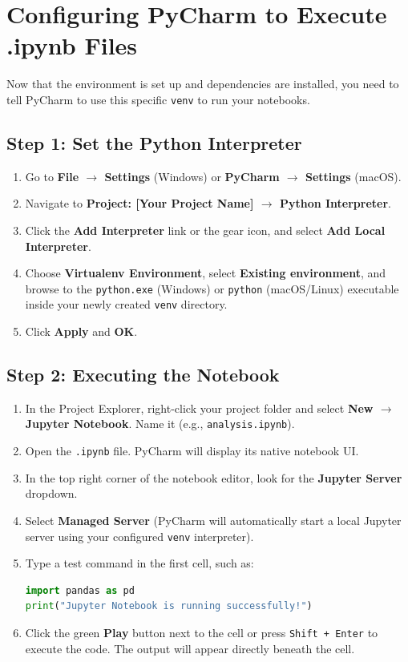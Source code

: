 \documentclass[12pt, a4paper]{article}
\begin{document}
\section{Configuring PyCharm to Execute .ipynb Files}

Now that the environment is set up and dependencies are installed, you need to tell PyCharm to use this specific \texttt{venv} to run your notebooks.

\subsection{Step 1: Set the Python Interpreter}
\begin{enumerate}
    \item Go to \textbf{File $\rightarrow$ Settings} (Windows) or \textbf{PyCharm $\rightarrow$ Settings} (macOS).
    \item Navigate to \textbf{Project: [Your Project Name] $\rightarrow$ Python Interpreter}.
    \item Click the \textbf{Add Interpreter} link or the gear icon, and select \textbf{Add Local Interpreter}.
    \item Choose \textbf{Virtualenv Environment}, select \textbf{Existing environment}, and browse to the \texttt{python.exe} (Windows) or \texttt{python} (macOS/Linux) executable inside your newly created \texttt{venv} directory.
    \item Click \textbf{Apply} and \textbf{OK}.
\end{enumerate}

\subsection{Step 2: Executing the Notebook}
\begin{enumerate}
    \item In the Project Explorer, right-click your project folder and select \textbf{New $\rightarrow$ Jupyter Notebook}. Name it (e.g., \texttt{analysis.ipynb}).
    \item Open the \texttt{.ipynb} file. PyCharm will display its native notebook UI.
    \item In the top right corner of the notebook editor, look for the \textbf{Jupyter Server} dropdown.
    \item Select \textbf{Managed Server} (PyCharm will automatically start a local Jupyter server using your configured \texttt{venv} interpreter).
    \item Type a test command in the first cell, such as:
\begin{lstlisting}[language=Python]
import pandas as pd
print("Jupyter Notebook is running successfully!")
\end{lstlisting}
    \item Click the green \textbf{Play} button next to the cell or press \texttt{Shift + Enter} to execute the code. The output will appear directly beneath the cell.
\end{enumerate}
\end{document}
